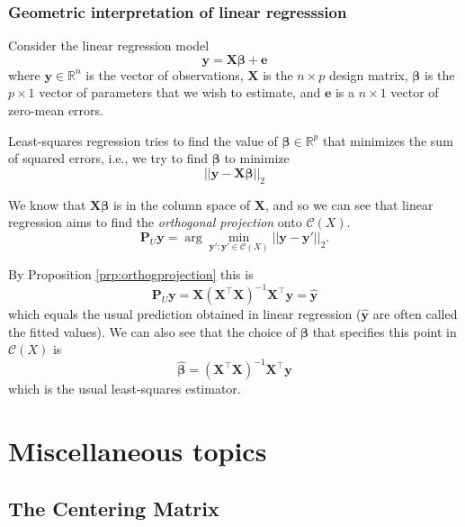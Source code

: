\documentclass[]{book}
\theoremstyle{definition}
\theoremstyle{definition}
\theoremstyle{definition}
\theoremstyle{remark}
\begin{document}
\hypertarget{geometric-interpretation-of-linear-regresssion}{%
\subsubsection{Geometric interpretation of linear regresssion}\label{geometric-interpretation-of-linear-regresssion}}

Consider the linear regression model
\[\boldsymbol y= \boldsymbol X\boldsymbol \beta+\boldsymbol e\]
where \(\boldsymbol y\in\mathbb{R}^n\) is the vector of observations, \(\boldsymbol X\) is the \(n\times p\) design matrix, \(\boldsymbol \beta\) is the \(p\times 1\) vector of parameters that we wish to estimate, and \(\boldsymbol e\) is a \(n\times 1\) vector of zero-mean errors.

Least-squares regression tries to find the value of \(\boldsymbol \beta\in \mathbb{R}^p\) that minimizes the sum of squared errors, i.e., we try to find \(\boldsymbol \beta\) to minimize
\[||\boldsymbol y- \boldsymbol X\boldsymbol \beta||_2\]

We know that \(\boldsymbol X\boldsymbol \beta\) is in the column space of \(\boldsymbol X\), and so we can see that linear regression aims to find the \emph{orthogonal projection} onto \(\mathcal{C}(X)\).
\[\boldsymbol P_U\boldsymbol y=\arg \min_{\boldsymbol y': \boldsymbol y' \in \mathcal{C}(X)} ||\boldsymbol y-\boldsymbol y'||_2.\]

By Proposition \ref{prp:orthogprojection} this is
\[\boldsymbol P_U\boldsymbol y= \boldsymbol X(\boldsymbol X^\top \boldsymbol X)^{-1}\boldsymbol X^\top \boldsymbol y=\hat{\boldsymbol y}\]
which equals the usual prediction obtained in linear regression (\(\hat{\boldsymbol y}\) are often called the fitted values). We can also see that the choice of \(\boldsymbol \beta\) that specifies this point in \(\mathcal{C}(X)\) is
\[\hat{\boldsymbol \beta}=(\boldsymbol X^\top \boldsymbol X)^{-1}\boldsymbol X^\top \boldsymbol y\]
which is the usual least-squares estimator.

\hypertarget{linalg-misc}{%
\section{Miscellaneous topics}\label{linalg-misc}}

\hypertarget{the-centering-matrix}{%
\subsection{The Centering Matrix}\label{the-centering-matrix}}
\end{document}
